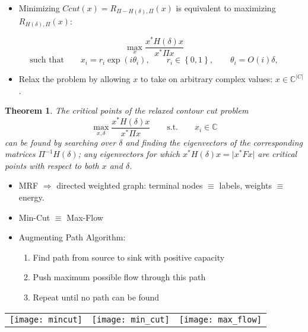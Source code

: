 \documentclass[11pt, a4paper, landscape]{article}
\newtheorem{theorem}{Theorem}[section]
\begin{document}
\NewPage{}
\vfill
\begin{itemize}
\item Minimizing $Ccut(x) = R_{\Pi - H(\delta), \Pi}(x)$ is equivalent to maximizing $R_{H(\delta), \Pi}(x)$:
\end{itemize}
\begin{equation}
\max_x \dfrac{x^*H(\delta)x}{x^* \Pi x} 
\end{equation}
\begin{equation*}
 \mbox{such that} \qquad x_i = r_i\exp(i\theta_i), \qquad r_i \in \left\lbrace 0, 1 \right\rbrace, \qquad \theta_i = O(i)\delta,
\end{equation*}
\begin{itemize}
\item Relax the problem by allowing $x$ to take on arbitrary complex values: $x \in \mathbb{C}^{\lvert C \rvert}$.
\end{itemize}
\begin{theorem}
\label{theorem:hermitian}
The critical points of the relaxed contour cut problem
\begin{equation}
\max_{x, \delta} \dfrac{x^*H(\delta)x}{x^* \Pi x} \qquad \mbox{s.t.} \qquad x_i \in \mathbb{C}
\label{eq:hermitian}
\end{equation}
can be found by searching over $\delta$ and finding the eigenvectors of the corresponding matrices $\Pi^{-1}H(\delta)$; any eigenvectors for which $x^*H(\delta)x = \lvert x^*Fx \rvert$ are critical points
with respect to both $x$ and $\delta$.
\end{theorem}
\vfill


\NewPage{}
\vfill
\begin{itemize}
\item MRF $\Rightarrow$ directed weighted graph: terminal nodes $\equiv$ labels, weights $\equiv$ energy.
\item Min-Cut $\equiv$ Max-Flow
\item Augmenting Path Algorithm:
\begin{enumerate}
\item Find path from source to sink with positive capacity
\item Push maximum possible flow through this path
\item Repeat until no path can be found
\end{enumerate}
\end{itemize}
\begin{table}
  \centering
  \begin{tabular}{@{} M{.3\linewidth} M{.3\linewidth} M{.3\linewidth} @{}}
      \texttt{[image: mincut]}%
      &
      \texttt{[image: min\_cut]}%
      &
      \texttt{[image: max\_flow]}%
  \end{tabular}
\end{table}
\vfill
\end{document}
